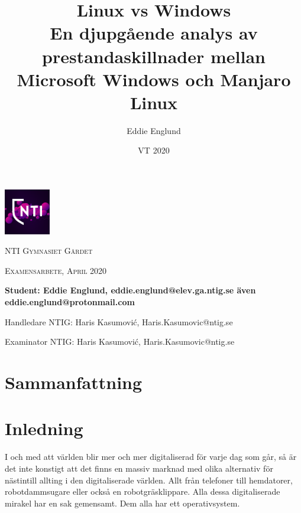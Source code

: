 \documentclass[12pt, a4paper]{report}
\author{Eddie Englund}
\title{Linux vs Windows\\[0.2em]\smaller{}En djupgående analys av prestandaskillnader mellan Microsoft Windows och Manjaro Linux}
\date{VT 2020}
\begin{document}
\begin{titlepage}
    \maketitle

    \begin{center}
        \thispagestyle{empty}
    
        \includegraphics[width=0.15\textwidth]{nti}\par\vspace{1cm}

    {\scshape\LARGE NTI Gymnasiet Gärdet \par}
    \vspace{1cm}
    {\scshape\Large Examensarbete, April 2020\par}
	\vspace{1.5cm}
    \textbf{
    Student: Eddie Englund, eddie.englund@elev.ga.ntig.se även eddie.englund@protonmail.com}
    \vspace{0.2cm}

    Handledare NTIG: Haris Kasumović, Haris.Kasumovic@ntig.se
    \vspace{0.1cm}

    Examinator NTIG: Haris Kasumović, Haris.Kasumovic@ntig.se
    
    \end{center}
\end{titlepage}


\section{Sammanfattning}\label{sum}

    \begin{abstract}

    \end{abstract}

\tableofcontents

\vspace{3cm}

    
\section{Inledning}
 
 
   I och med att världen blir mer och mer digitaliserad för varje dag som går, så är det inte konstigt att det finns en massiv marknad med olika alternativ för nästintill allting i den digitaliserade världen. Allt från telefoner till hemdatorer, robotdammsugare eller också en robotgräsklippare. Alla dessa digitaliserade mirakel har en sak gemensamt. Dem alla har ett operativsystem.
 
\end{document}
